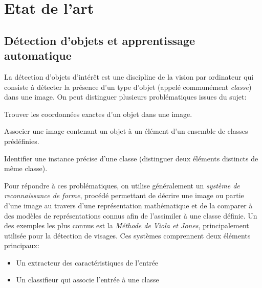 	\section{Etat de l'art}

		\subsection{Détection d'objets et apprentissage automatique}
			
			La détection d'objets d'intérêt est une discipline de la vision par ordinateur qui consiste à détecter la présence d'un type d'objet (appelé communément \emph{classe}) dans une image. On peut distinguer plusieurs problématiques issues du sujet:
			\begin{description}[noitemsep]
				\item[Localisation:] Trouver les coordonnées exactes d'un objet dans une image.
				\item[Classification:] Associer une image contenant un objet à un élément d'un ensemble de classes prédéfinies.
				\item[Reconnaissance:] Identifier une instance précise d'une classe (distinguer deux éléments distincts de même classe).
			\end{description}
			Pour répondre à ces problématiques, on utilise généralement un \emph{système de reconnaissance de forme}, procédé permettant de décrire une image ou partie d'une image au travers d'une représentation mathématique et de la comparer à des modèles de représentations connus afin de l'assimiler à une classe définie. Un des exemples les plus connus est la \emph{Méthode de Viola et Jones}\cite{viola}, principalement utilisée pour la détection de visages. Ces systèmes comprennent deux éléments principaux:
			\begin{itemize}[noitemsep]
				\item Un extracteur des caractéristiques de l'entrée
				\item Un classifieur qui associe l'entrée à une classe
			\end{itemize}
			\par
